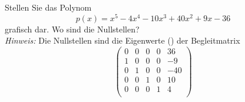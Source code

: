 \begin{aufg}[0]
Stellen Sie das Polynom 
\[ p(x)= x^5-4x^4 -10x^3 +40x^2 +9x -36\]
 grafisch dar. Wo sind die Nullstellen?\\
\textit{Hinweis:} Die Nullstellen sind die Eigenwerte () der Begleitmatrix
\[ \left( \begin{array} {ccccccc}
 0 & 0 & 0 & 0 & 36\\
1 & 0  & 0 & 0  & -9\\ 
0 & 1  & 0 & 0  & -40\\ 
 0 & 0& 1 & 0 &  10\\
 0 & 0 & 0 & 1  &  4 \\ 
\end{array} \right) \]
\end{aufg}